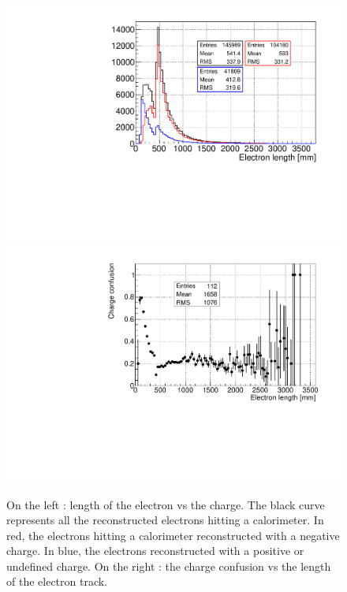 \documentclass[main.tex]{subfiles}
\begin{document}
\begin{figure}[h!]
\begin{center}
\includegraphics[scale=0.34]{pictures/Chap5/length_tracker_charge_confusion_2.pdf}
\includegraphics[scale=0.34]{pictures/Chap5/charge_confusion_length_tracker.pdf}
\caption{On the left : length of the electron vs the charge. The black curve represents all the reconstructed electrons hitting a calorimeter. In red, the electrons hitting a calorimeter reconstructed with a negative charge. In blue, the electrons reconstructed with a positive or undefined charge. On the right : the charge confusion vs the length of the electron track.}
\label{charge_confusion_tracker_plots}
\end{center}
\end{figure}
\end{document}
